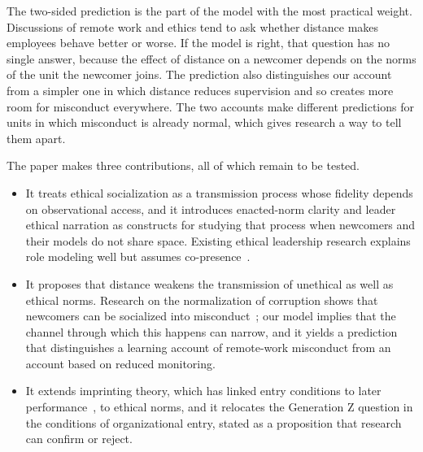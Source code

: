 The two-sided prediction is the part of the model with the most practical weight. Discussions of remote work and ethics tend to ask whether distance makes employees behave better or worse. If the model is right, that question has no single answer, because the effect of distance on a newcomer depends on the norms of the unit the newcomer joins. The prediction also distinguishes our account from a simpler one in which distance reduces supervision and so creates more room for misconduct everywhere. The two accounts make different predictions for units in which misconduct is already normal, which gives research a way to tell them apart.

The paper makes three contributions, all of which remain to be tested.

\begin{itemize}
\item It treats ethical socialization as a transmission process whose fidelity depends on observational access, and it introduces enacted-norm clarity and leader ethical narration as constructs for studying that process when newcomers and their models do not share space. Existing ethical leadership research explains role modeling well but assumes co-presence~\citep{brown2005ethical}.
\item It proposes that distance weakens the transmission of unethical as well as ethical norms. Research on the normalization of corruption shows that newcomers can be socialized into misconduct~\citep{ashforth2003normalization}; our model implies that the channel through which this happens can narrow, and it yields a prediction that distinguishes a learning account of remote-work misconduct from an account based on reduced monitoring.
\item It extends imprinting theory, which has linked entry conditions to later performance~\citep{tilcsik2014imprint}, to ethical norms, and it relocates the Generation Z question in the conditions of organizational entry, stated as a proposition that research can confirm or reject.
\end{itemize}
